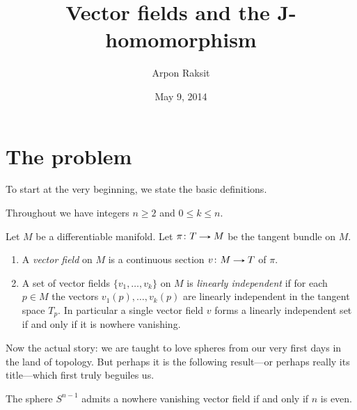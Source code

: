 


\usepackage{tikz}


\title{Vector fields and the J-homomorphism}
\author{Arpon Raksit}
\date{May 9, 2014}


\maketitle
\thispagestyle{fancy}


\section{The problem}

To start at the very beginning, we state the basic definitions.

\begin{notation}
  \label{ints}
  Throughout we have integers $n \ge 2$ and $0 \le k \le n$.
\end{notation}

\begin{definitions}
  \label{vfield-dfn}
  Let $M$ be a differentiable manifold. Let $\pi \c T \to M$ be the
  tangent bundle on $M$.
  \begin{enumerate}
  \item A \emph{vector field} on $M$ is a continuous section $v \c M
    \to T$ of $\pi$.
  \item A set of vector fields $\{v_1,\ldots,v_k\}$ on $M$ is
    \emph{linearly independent} if for each $p \in M$ the vectors
    $v_1(p),\ldots,v_k(p)$ are linearly independent in the tangent
    space $T_p$. In particular a single vector field $v$ forms a
    linearly independent set if and only if it is nowhere vanishing.
  \end{enumerate}
\end{definitions}

Now the actual story: we are taught to love spheres from our very
first days in the land of topology. But perhaps it is the following
result---or perhaps really its title---which first truly beguiles us.

\begin{theorem}
  \label{hairy-ball}
  The sphere $S^{n-1}$ admits a nowhere vanishing vector field if and
  only if $n$ is even.
\end{theorem}

